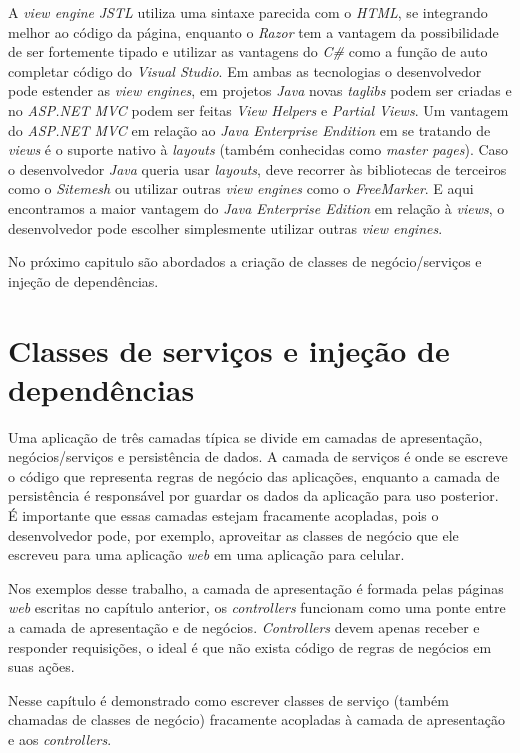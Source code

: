 \documentclass[a4paper,12pt]{article}
\newcommand{\est}[1] {
\textit{#1}}
\newcommand{\sigla}[1] {
\textit{#1}}
\newcommand{\lang}[1] {
\textit{#1}}
\begin{document}
A \est{view engine} \sigla{JSTL} utiliza uma sintaxe parecida com o \lang{HTML}, se integrando melhor ao código da página, enquanto o \lang{Razor} tem a vantagem da possibilidade de ser fortemente tipado e utilizar as vantagens do \lang{C\#} como a função de auto completar código do \est{Visual Studio}. Em ambas as tecnologias o desenvolvedor pode estender as \est{view engines}, em projetos \lang{Java} novas \est{taglibs} podem ser criadas e no \est{ASP.NET MVC} podem ser feitas \est{View Helpers} e \est{Partial Views}. Um vantagem do \est{ASP.NET MVC} em relação ao \est{Java Enterprise Endition} em se tratando de \est{views} é o suporte nativo à \est{layouts} (também conhecidas como \est{master pages}). Caso o desenvolvedor \lang{Java} queria usar \est{layouts}, deve recorrer às bibliotecas de terceiros como o \est{Sitemesh} ou utilizar outras \est{view engines} como o \est{FreeMarker}. E aqui encontramos a maior vantagem do \est{Java Enterprise Edition} em relação à \est{views}, o desenvolvedor pode escolher simplesmente utilizar outras \est{view engines}.

No próximo capitulo são abordados a criação de classes de negócio/serviços e injeção de dependências. 

\newpage
\section{Classes de serviços e injeção de dependências}

Uma aplicação de três camadas típica se divide em camadas de apresentação, negócios/serviços e persistência de dados. A camada de serviços é onde se escreve o código que representa regras de negócio das aplicações, enquanto a camada de persistência é responsável por guardar os dados da aplicação para uso posterior. É importante que essas camadas estejam fracamente acopladas, pois o desenvolvedor pode, por exemplo, aproveitar as classes de negócio que ele escreveu para uma aplicação \est{web} em uma aplicação para celular.

Nos exemplos desse trabalho, a camada de apresentação é formada pelas páginas \est{web} escritas no capítulo anterior, os \est{controllers} funcionam como uma ponte entre a camada de apresentação e de negócios. \est{Controllers} devem apenas receber e responder requisições, o ideal é que não exista código de regras de negócios em suas ações.

Nesse capítulo é demonstrado como escrever classes de serviço (também chamadas de classes de negócio) fracamente acopladas à camada de apresentação e aos \est{controllers}. 
\end{document}
